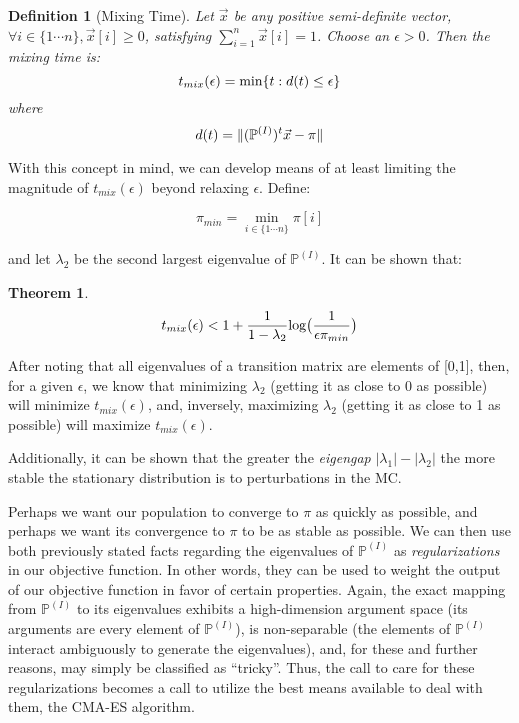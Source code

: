 \documentclass{article}
\newtheorem{defn}{Definition}
\newtheorem{Theorem}{Theorem}
\DeclarePairedDelimiter\norm{\lVert}{\rVert}
\begin{document}
\begin{defn}[Mixing Time]
    Let $\vec{x}$ be any positive semi-definite vector, $\forall i \in \{1 \cdots n\}, \vec{x}[i] \geq 0$, satisfying $\sum_{i=1}^n \vec{x}[i] = 1$. Choose an $\epsilon > 0$. Then the mixing time is:
    \[
    t_{mix}(\epsilon) = \textnormal{min}\{t:d(t) \leq \epsilon\}
    \]
    where
    \[
    d(t) = \norm{(\mathbb{P}^{(I)})^t\vec{x} - \pi}
    \]
\end{defn}

With this concept in mind, we can develop means of at least limiting the magnitude of $t_{mix}(\epsilon)$ beyond relaxing $\epsilon$. Define:

\[
\pi_{min} = \min_{i \in \{1 \cdots n\}} \pi[i]
\]

and let $\lambda_2$ be the second largest eigenvalue of $\mathbb{P}^{(I)}$. It can be shown that:

\begin{Theorem}
    \[
    t_{mix}(\epsilon) < 1 + \frac{1}{1-\lambda_2} \textnormal{log}\big(\frac{1}{\epsilon\pi_{min}}\big)
    \]
\end{Theorem}

\cite{kale}

After noting that all eigenvalues of a transition matrix are elements of [0,1], then, for a given $\epsilon$, we know that minimizing $\lambda_2$ (getting it as close to 0 as possible) will minimize $t_{mix}(\epsilon)$, and, inversely, maximizing $\lambda_2$ (getting it as close to 1 as possible) will maximize $t_{mix}(\epsilon)$.

Additionally, it can be shown that the greater the \textit{eigengap} $|\lambda_1| - |\lambda_2|$ the more stable the stationary distribution is to perturbations in the MC. \cite{secondev}

Perhaps we want our population to converge to $\pi$ as quickly as possible, and perhaps we want its convergence to $\pi$ to be as stable as possible. We can then use both previously stated facts regarding the eigenvalues of $\mathbb{P}^{(I)}$ as \textit{regularizations} in our objective function. In other words, they can be used to weight the output of our objective function in favor of certain properties. Again, the exact mapping from $\mathbb{P}^{(I)}$ to its eigenvalues exhibits a high-dimension argument space (its arguments are every element of $\mathbb{P}^{(I)}$), is non-separable (the elements of $\mathbb{P}^{(I)}$ interact ambiguously to generate the eigenvalues), and, for these and further reasons, may simply be classified as ``tricky''. Thus, the call to care for these regularizations becomes a call to utilize the best means available to deal with them, the CMA-ES algorithm.
\end{document}
